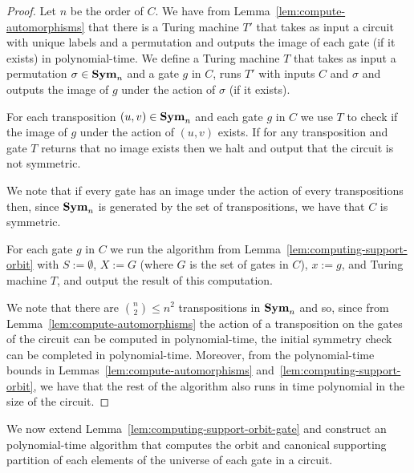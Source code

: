 \documentclass[../paper.tex]{subfiles}
\begin{document}
\begin{proof}
  Let $n$ be the order of $C$. We have from
  Lemma~\ref{lem:compute-automorphisms} that there is a Turing machine $T'$ that
  takes as input a circuit with unique labels and a permutation and outputs the
  image of each gate (if it exists) in polynomial-time. We define a Turing
  machine $T$ that takes as input a permutation $\sigma \in \text{\textbf{Sym}}_n$ and a gate
  $g$ in $C$, runs $T'$ with inputs $C$ and $\sigma$ and outputs the image of
  $g$ under the action of $\sigma$ (if it exists).

  For each transposition $(u,v) \in \text{\textbf{Sym}}_n$ and each gate $g$ in $C$ we use $T$
  to check if the image of $g$ under the action of $(u,v)$ exists. If for any
  transposition and gate $T$ returns that no image exists then we halt and
  output that the circuit is not symmetric.

  We note that if every gate has an image under the action of every
  transpositions then, since $\text{\textbf{Sym}}_n$ is generated by the set of transpositions,
  we have that $C$ is symmetric.

  For each gate $g$ in $C$ we run the algorithm from
  Lemma~\ref{lem:computing-support-orbit} with $S := \emptyset$, $X := G$ (where
  $G$ is the set of gates in $C$), $x := g$, and Turing machine $T$, and output
  the result of this computation.
  
  We note that there are ${{n}\choose{2}} \leq n^2$ transpositions in $\text{\textbf{Sym}}_n$
  and so, since from Lemma~\ref{lem:compute-automorphisms} the action of a
  transposition on the gates of the circuit can be computed in polynomial-time,
  the initial symmetry check can be completed in polynomial-time. Moreover, from
  the polynomial-time bounds in Lemmas~\ref{lem:compute-automorphisms}
  and~\ref{lem:computing-support-orbit}, we have that the rest of the algorithm
  also runs in time polynomial in the size of the circuit.
\end{proof}

We now extend Lemma~\ref{lem:computing-support-orbit-gate} and construct an
polynomial-time algorithm that computes the orbit and canonical supporting
partition of each elements of the universe of each gate in a circuit.
\end{document}
